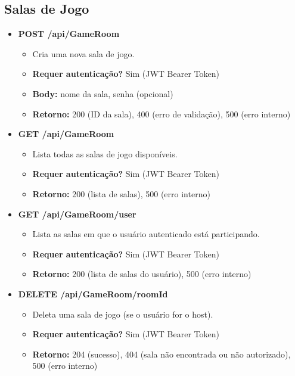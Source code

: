 \subsection{Salas de Jogo}
\begin{itemize}
    \item \textbf{POST /api/GameRoom}
    \begin{itemize}
        \item Cria uma nova sala de jogo.
        \item \textbf{Requer autenticação?} Sim (JWT Bearer Token)
        \item \textbf{Body:} nome da sala, senha (opcional)
        \item \textbf{Retorno:} 200 (ID da sala), 400 (erro de validação), 500 (erro interno)
    \end{itemize}
    \item \textbf{GET /api/GameRoom}
    \begin{itemize}
        \item Lista todas as salas de jogo disponíveis.
        \item \textbf{Requer autenticação?} Sim (JWT Bearer Token)
        \item \textbf{Retorno:} 200 (lista de salas), 500 (erro interno)
    \end{itemize}
    \item \textbf{GET /api/GameRoom/user}
    \begin{itemize}
        \item Lista as salas em que o usuário autenticado está participando.
        \item \textbf{Requer autenticação?} Sim (JWT Bearer Token)
        \item \textbf{Retorno:} 200 (lista de salas do usuário), 500 (erro interno)
    \end{itemize}
    \item \textbf{DELETE /api/GameRoom/{roomId}}
    \begin{itemize}
        \item Deleta uma sala de jogo (se o usuário for o host).
        \item \textbf{Requer autenticação?} Sim (JWT Bearer Token)
        \item \textbf{Retorno:} 204 (sucesso), 404 (sala não encontrada ou não autorizado), 500 (erro interno)
    \end{itemize}
\end{itemize}


